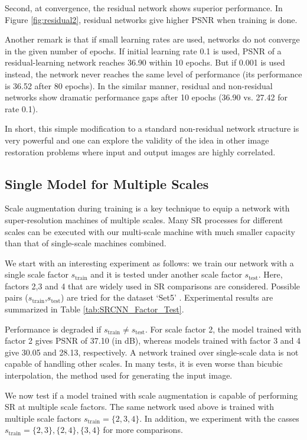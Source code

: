 \documentclass[10pt,twocolumn,letterpaper]{article}
\begin{document}
Second, at convergence, the residual network shows superior performance. In Figure \ref{fig:residual2}, residual networks give higher PSNR when training is done.

Another remark is that if small learning rates are used, networks do not converge in the given number of epochs. If initial learning rate 0.1 is used, PSNR of a residual-learning network reaches 36.90 within 10 epochs. But if 0.001 is used instead, the network never reaches the same level of performance (its performance is 36.52 after 80 epochs). In the similar manner, residual and non-residual networks show dramatic performance gaps after 10 epochs (36.90 vs. 27.42 for rate 0.1).

In short, this simple modification to a standard non-residual network structure is very powerful and one can explore the validity of the idea in other image restoration problems where input and output images are highly correlated.

\subsection{Single Model for Multiple Scales}
Scale augmentation during training is a key technique to equip a network with super-resolution machines of multiple scales. Many SR processes for different scales can be executed with our multi-scale machine with much smaller capacity than that of single-scale machines combined. 

We start with an interesting experiment as follows: we train our network with a single scale factor $s_{\text{train}}$ and it is tested under another scale factor $s_{\text{test}}$. Here, factors 2,3 and 4 that are widely used in SR comparisons are considered. Possible pairs ($s_{\text{train}}$,$s_{\text{test}}$) are tried for the dataset `Set5' \cite{bevilacqua2012}. Experimental results are summarized in Table \ref{tab:SRCNN_Factor_Test}. 

Performance is degraded if $s_{\text{train}} \neq s_{\text{test}}$. For scale factor 2, the model trained with factor 2 gives PSNR of 37.10 (in dB), whereas models trained with factor 3 and 4 give 30.05 and 28.13, respectively. A network trained over single-scale data is not capable of handling other scales. In many tests, it is even worse than bicubic interpolation, the method used for generating the input image. 

We now test if a model trained with scale augmentation is capable of performing SR at multiple scale factors. The same network used above is trained with multiple scale factors $s_{\text{train}} = \{2,3,4\}$. In addition, we experiment with the casses $s_{\text{train}} = \{2,3\}, \{2,4\}, \{3,4\}$ for more comparisons. 
\end{document}
